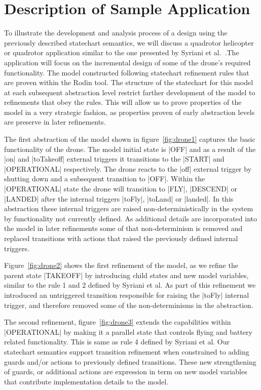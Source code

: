 

\section{Description of Sample Application}

To illustrate the development and analysis process of a design using the previously described 
statechart semantics, we will discuss a quadrotor helicopter or quadrotor application similar to 
the one presented by Syriani et al.~\cite{Syriani_2019}.The application will focus on the incremental 
design of some of the drone's required functionality.
The model constructed following statechart refinement rules that are proven within the Rodin tool.
The structure of the statechart for this model at each subsequent abstraction level restrict farther 
development of the model to refinements that obey the rules. This will allow us to prove properties 
of the model in a very strategic fashion, as properties proven of early abstraction levels 
are preserve in later refinements.

The first abstraction of the model shown in figure~\ref{fig:drone1} captures the basic 
functionality of the drone. The model initial state is |OFF| and as a result of the |on| and 
|toTakeoff| external triggers it transitions to the |START| and |OPERATIONAL| respectively. 
The drone reacts to the |off| external trigger by shutting down and a subsequent transition to |OFF|.
Within the |OPERATIONAL| state the drone will transition to |FLY|, |DESCEND| or |LANDED| 
after the internal triggers |toFly|, |toLand| or |landed|. In this abstraction these internal 
triggers are raised non-deterministically in the system by functionality not currently defined.
As additional details are incorporated into the model in later refinements some of that non-determinism is 
removed and replaced transitions with actions that raised the previously defined internal triggers.

Figure~\ref{fig:drone2} shows the first refinement of the model, as we refine the parent state |TAKEOFF|
by introducing child states and new model variables, similar to the rule 1 and 2 defined by Syriani et al.
As part of this refinement we introduced an untriggered transition responsible for 
raising the |toFly| internal trigger, and therefore removed some of the non-determinisms in the abstraction.

The second refinement, figure~\ref{fig:drone3} extends the capabilities within |OPERATIONAL| by making it a parallel
state that controls flying and battery related functionality. This is same as rule 4 defined by Syriani et al.
Our statechart semantics support transition refinement when constrained to adding guards and/or 
actions to previously defined transitions. These new strengthening of guards, or additional 
actions are expression in term on new model variables that contribute implementation details to the model.

